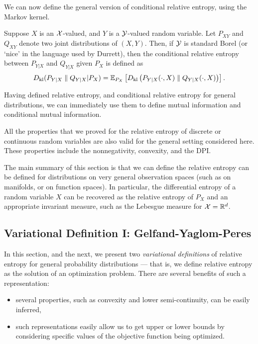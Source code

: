         We can now define the general version of conditional relative entropy, using the Markov kernel. 
        \begin{definition}
            \label{def:cond-rel-ent-general} Suppose $X$ is an $\mathcal{X}$-valued, and $Y$ is a $\mathcal{Y}$-valued random variable. Let $P_{XY}$ and $Q_{XY}$ denote two joint distributions of $(X, Y)$. Then, if $\mathcal{Y}$ is standard Borel (or `nice' in the language used by Durrett), then the conditional relative entropy between $P_{Y|X}$ and $Q_{Y|X}$ given $P_X$ is defined as 
            \begin{align}
                D_{\text{kl}}(P_{Y|X} \parallel Q_{Y|X} | P_X) = \mathbb{E}_{P_X}\left[ D_{\text{kl}}\left( P_{Y|X}(\cdot, X) \parallel Q_{Y|X}(\cdot, X) \right) \right]. 
            \end{align}
        \end{definition}

        \begin{remark}
            Having defined relative entropy, and conditional relative entropy for general distributions, we can immediately use them to define mutual information and conditional mutual information. 
        \end{remark}

        \begin{remark}
            All the properties that we proved for the relative entropy of discrete or continuous random variables are also valid for the general setting considered here. These properties include the nonnegativity, convexity, and the DPI. 
        \end{remark}
        
        The main summary of this section is that we can define the relative entropy can be defined for distributions on very general observation spaces (such as on manifolds, or on function spaces). In particular, the differential entropy of a random variable  $X$ can be recovered as the relative entropy of $P_X$ and an appropriate invariant measure, such as the Lebesgue measure for $\mathcal{X} = \mathbb{R}^d$. 

        \subsection{Variational Definition I: Gelfand-Yaglom-Peres} 
        \label{subsec:var-def-I-gelfand} 
            In this section, and the next, we present two \emph{variational definitions} of relative entropy for general probability distributions --- that is, we define relative entropy as the solution of an optimization problem. There are several benefits of such a representation: 
            \begin{itemize}
                \item several properties, such as convexity and lower semi-continuity, can be easily inferred, 
                \item such representations easily allow us to get upper or lower bounds by considering specific values of the objective function being optimized. 
            \end{itemize}

